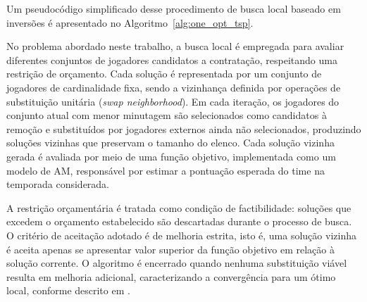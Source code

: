 Um pseudocódigo simplificado desse procedimento de busca local baseado em inversões é apresentado no 
Algoritmo~\ref{alg:one_opt_tsp}.



No problema abordado neste trabalho, a busca local é empregada para avaliar diferentes conjuntos de jogadores candidatos a contratação, respeitando 
uma restrição de orçamento. Cada solução é representada por um conjunto de jogadores de cardinalidade fixa, sendo a vizinhança definida por operações de 
substituição unitária (\textit{swap neighborhood}). Em cada iteração, os jogadores do conjunto atual com menor minutagem são selecionados como candidatos 
à remoção e substituídos por jogadores externos ainda não selecionados, produzindo soluções vizinhas que preservam o tamanho do elenco. 
Cada solução vizinha gerada é avaliada por meio de uma função objetivo, implementada como um modelo de AM, responsável por 
estimar a pontuação esperada do time na temporada considerada.

A restrição orçamentária é tratada como condição de factibilidade: soluções que excedem o orçamento estabelecido são descartadas durante o processo de busca. 
O critério de aceitação adotado é de melhoria estrita, isto é, uma solução vizinha é aceita apenas se apresentar valor superior da função objetivo em relação 
à solução corrente. O algoritmo é encerrado quando nenhuma substituição viável resulta em melhoria adicional, caracterizando a convergência para um ótimo local, 
conforme descrito em \cite{Gendreau2010}.